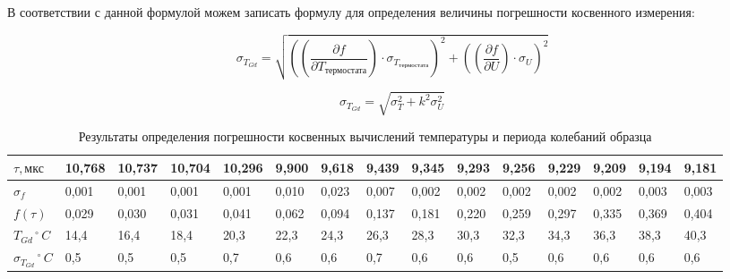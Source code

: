 \documentclass[10pt,a4paper]{article}
\begin{document}
	В соответствии с данной формулой можем записать формулу для определения величины погрешности косвенного измерения:
	
	\begin{equation}
		\sigma_{T_{Gd}} = \sqrt{\left(\left(\frac{\partial f}{\partial T_{\text{термостата}}}\right)\cdot \sigma_{T_{\text{термостата}}}\right)^{2} + \left(\left(\frac{\partial f}{\partial U}\right)\cdot \sigma_{U}\right)^{2}}
	\end{equation}
	
	\begin{equation}
		\sigma_{T_{Gd}} = \sqrt{\sigma_{T}^{2} + k^{2}\sigma_{U}^{2}}
	\end{equation}	
	
	\begin{table}[h!]
\hspace{-1cm}
\begin{tabular}{|l|l|l|l|l|l|l|l|l|l|l|l|l|l|l|}
\hline
$\tau, \text{мкс}$               & 10,768 & 10,737 & 10,704 & 10,296 & 9,900 & 9,618 & 9,439 & 9,345 & 9,293 & 9,256 & 9,229 & 9,209 & 9,194 & 9,181 \\ \hline
$\sigma_{f}$          & 0,001  & 0,001  & 0,001  & 0,001  & 0,010 & 0,023 & 0,007 & 0,002 & 0,002 & 0,002 & 0,002 & 0,002 & 0,003 & 0,003 \\ \hline
$f\left(\tau\right)$ & 0,029 & 0,030 & 0,031 & 0,041 & 0,062 & 0,094 & 0,137 & 0,181 & 0,220 & 0,259 & 0,297 & 0,335 & 0,369 & 0,404 \\ \hline
$T_{Gd}\,  ^{\circ}\, C$ & 14,4   & 16,4   & 18,4   & 20,3   & 22,3  & 24,3  & 26,3  & 28,3  & 30,3  & 32,3  & 34,3  & 36,3  & 38,3  & 40,3  \\ \hline
$\sigma_{T_{Gd}}\,  ^{\circ}\, C$    & 0,5    & 0,5    & 0,5    & 0,7    & 0,6   & 0,6   & 0,7   & 0,6   & 0,6   & 0,5   & 0,6   & 0,6   & 0,6   & 0,6	   \\ \hline
\end{tabular}
\caption{Результаты определения погрешности косвенных вычислений температуры и периода колебаний образца}
\label{tab:final_data}
\end{table}			
\end{document}
